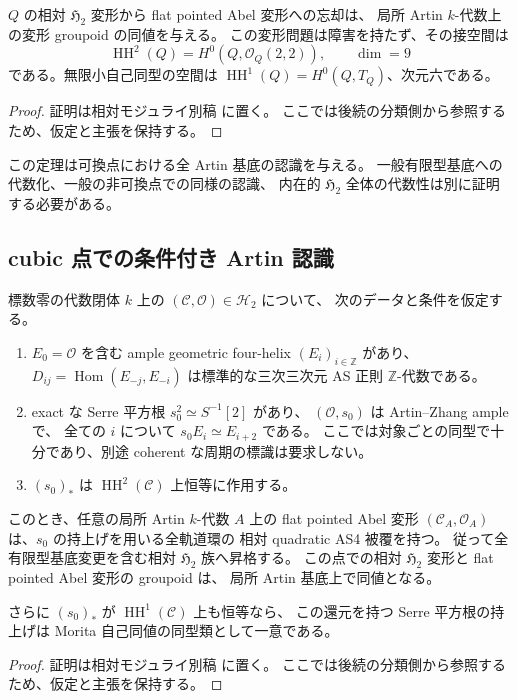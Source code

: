 \begin{corollary}[可換点での形式変形問題]
\label{cor:quadric-formal-deformation-equivalence}
$Q$ の相対 $\mathfrak H_2$ 変形から flat pointed Abel 変形への忘却は、
局所 Artin $k$-代数上の変形 groupoid の同値を与える。
この変形問題は障害を持たず、その接空間は
\[
 \operatorname{HH}^2(Q)=H^0(Q,\mathcal O_Q(2,2)),\qquad \dim=9
\]
である。無限小自己同型の空間は $\operatorname{HH}^1(Q)=H^0(Q,T_Q)$、次元六である。
\end{corollary}
\begin{proof}
証明は相対モジュライ別稿 \cite[\texttt{quadric_artin_hull} 節]{QuadricModuli2026} に置く。
ここでは後続の分類側から参照するため、仮定と主張を保持する。
\end{proof}

この定理は可換点における全 Artin 基底の認識を与える。
一般有限型基底への代数化、一般の非可換点での同様の認識、
内在的 $\mathfrak H_2$ 全体の代数性は別に証明する必要がある。

\subsection{cubic 点での条件付き Artin 認識}

\begin{proposition}
\label{prop:cubic-artin-hhtrivial-conditional}
標数零の代数閉体 $k$ 上の $(\mathcal C,\mathcal O)\in\mathcal H_2$ について、
次のデータと条件を仮定する。
\begin{enumerate}
\item $E_0=\mathcal O$ を含む ample geometric four-helix $(E_i)_{i\in\mathbb Z}$ があり、
  $D_{ij}=\operatorname{Hom}(E_{-j},E_{-i})$ は標準的な三次三次元 AS 正則
  $\mathbb Z$-代数である。
\item exact な Serre 平方根 $s_0^2\simeq S^{-1}[2]$ があり、
  $(\mathcal O,s_0)$ は Artin--Zhang ample で、
  全ての $i$ について $s_0E_i\simeq E_{i+2}$ である。
  ここでは対象ごとの同型で十分であり、別途 coherent な周期の標識は要求しない。
\item $(s_0)_*$ は $\operatorname{HH}^2(\mathcal C)$ 上恒等に作用する。
\end{enumerate}
このとき、任意の局所 Artin $k$-代数 $A$ 上の flat pointed Abel 変形
$(\mathcal C_A,\mathcal O_A)$ は、$s_0$ の持上げを用いる全軌道環の
相対 quadratic AS4 被覆を持つ。
従って全有限型基底変更を含む相対 $\mathfrak H_2$ 族へ昇格する。
この点での相対 $\mathfrak H_2$ 変形と flat pointed Abel 変形の groupoid は、
局所 Artin 基底上で同値となる。

さらに $(s_0)_*$ が $\operatorname{HH}^1(\mathcal C)$ 上も恒等なら、
この還元を持つ Serre 平方根の持上げは Morita 自己同値の同型類として一意である。
\end{proposition}
\begin{proof}
証明は相対モジュライ別稿 \cite[\texttt{quadric_artin_hull} 節]{QuadricModuli2026} に置く。
ここでは後続の分類側から参照するため、仮定と主張を保持する。
\end{proof}

